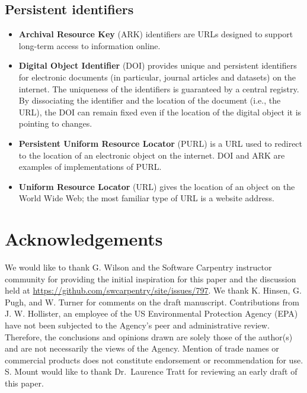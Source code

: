 \documentclass[10pt,letterpaper]{article}
\begin{document}
\subsection*{Persistent identifiers}\label{persistent-identifiers}

\begin{itemize}
\item
  \textbf{Archival Resource Key} (ARK) identifiers are URLs designed to
  support long-term access to information online.
\item
  \textbf{Digital Object Identifier} (DOI) provides unique and
  persistent identifiers for electronic documents (in particular,
  journal articles and datasets) on the internet. The uniqueness of the
  identifiers is guaranteed by a central registry. By dissociating the
  identifier and the location of the document (i.e., the URL), the DOI
  can remain fixed even if the location of the digital object it is
  pointing to changes.
\item
  \textbf{Persistent Uniform Resource Locator} (PURL) is a URL used to
  redirect to the location of an electronic object on the internet. DOI
  and ARK are examples of implementations of PURL.
\item
  \textbf{Uniform Resource Locator} (URL) gives the location of an
  object on the World Wide Web; the most familiar type of URL is a
  website address.
\end{itemize}

\section*{Acknowledgements}\label{acknowledgements}

We would like to thank G. Wilson and the Software Carpentry instructor
community for providing the initial inspiration for this paper and the
discussion held at \url{https://github.com/swcarpentry/site/issues/797}.
We thank K. Hinsen, G. Pugh, and W. Turner for comments on the draft
manuscript. Contributions from J. W. Hollister, an employee of the US
Environmental Protection Agency (EPA) have not been subjected to the
Agency's peer and administrative review. Therefore, the conclusions and
opinions drawn are solely those of the author(s) and are not necessarily
the views of the Agency. Mention of trade names or commercial products
does not constitute endorsement or recommendation for use. S. Mount
would like to thank Dr.~Laurence Tratt for reviewing an early draft of
this paper.
\end{document}
